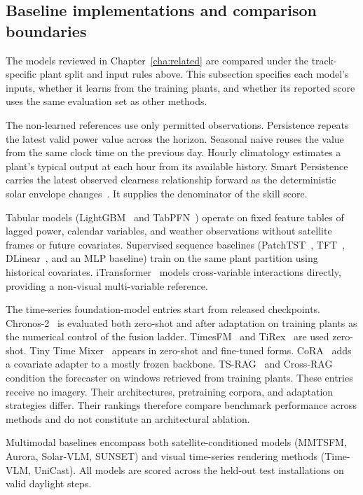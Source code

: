 \subsection{Baseline implementations and comparison boundaries}
\label{sec:baseline-implementations}

The models reviewed in Chapter~\ref{cha:related} are compared under the track-specific plant split and input rules above. This subsection specifies each model’s inputs, whether it learns from the training plants, and whether its reported score uses the same evaluation set as other methods.

The non-learned references use only permitted observations. Persistence repeats the latest valid power value across the horizon. Seasonal naive reuses the value from the same clock time on the previous day. Hourly climatology estimates a plant's typical output at each hour from its available history. Smart Persistence carries the latest observed clearness relationship forward as the deterministic solar envelope changes~\cite{haurwitz}. It supplies the denominator of the skill score.

Tabular models (LightGBM~\cite{lightgbm} and TabPFN~\cite{tabpfn3}) operate on fixed feature tables of lagged power, calendar variables, and weather observations without satellite frames or future covariates. Supervised sequence baselines (PatchTST~\cite{patchtst}, TFT~\cite{tft}, DLinear~\cite{dlinear}, and an MLP baseline) train on the same plant partition using historical covariates. iTransformer~\cite{itransformer} models cross-variable interactions directly, providing a non-visual multi-variable reference.

The time-series foundation-model entries start from released checkpoints. Chronos-2~\cite{chronos2} is evaluated both zero-shot and after adaptation on training plants as the numerical control of the fusion ladder. TimesFM~\cite{timesfm} and TiRex~\cite{tirex} are used zero-shot. Tiny Time Mixer~\cite{ttm} appears in zero-shot and fine-tuned forms. CoRA~\cite{cora} adds a covariate adapter to a mostly frozen backbone. TS-RAG~\cite{tsrag} and Cross-RAG~\cite{crossrag} condition the forecaster on windows retrieved from training plants. These entries receive no imagery. Their architectures, pretraining corpora, and adaptation strategies differ. Their rankings therefore compare benchmark performance across methods and do not constitute an architectural ablation.

Multimodal baselines encompass both satellite-conditioned models (MMTSFM, Aurora, Solar-VLM, SUNSET) and visual time-series rendering methods (Time-VLM, UniCast). All models are scored across the held-out test installations on valid daylight steps.

